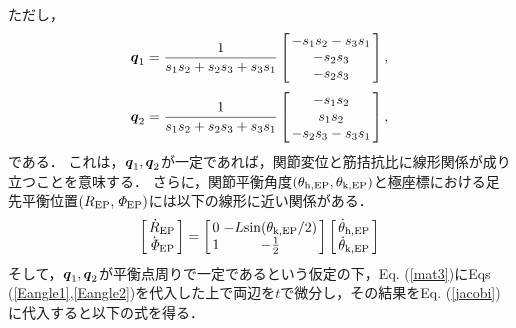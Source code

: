 ただし，
\begin{eqnarray}
 \arraycolsep=1.5pt
 \ve{q}_1=\frac{1}{s_{1}s_{2}+s_{2}s_{3}+s_{3}s_{1}}
 \left[
  \begin{array}{c}
   -s_{1}s_{2}-s_{3}s_{1} \\
   -s_{2}s_{3} \\
   -s_{2}s_{3}
  \end{array}
 \right],
 \label{q1}
\end{eqnarray}
\begin{eqnarray}
 \arraycolsep=1.5pt
 \ve{q}_2=\frac{1}{s_{1}s_{2}+s_{2}s_{3}+s_{3}s_{1}}
 \left[
  \begin{array}{c}
   -s_{1}s_{2} \\
   s_{1}s_{2} \\
   -s_{2}s_{3}-s_{3}s_{1}
  \end{array}
 \right],
 \label{q2}
\end{eqnarray}
である．
これは，$\mbox{\boldmath $q$}_1,\mbox{\boldmath $q$}_2$が一定であれば，関節変位と筋拮抗比に線形関係が成り立つことを意味する．
さらに，関節平衡角度$(\theta_{\rm h,EP},\theta_{\rm k,EP})$と極座標における足先平衡位置$(R_{\rm EP},{\it \Phi}_{\rm EP})$には以下の線形に近い関係がある\cite{Mitsuda1996}．
\begin{eqnarray}
 \arraycolsep=1.5pt
 \left[
  \begin{array}{c}
   \dot{R}_{\rm EP} \\
   \dot{\it \Phi}_{\rm EP}
  \end{array}
 \right]
 =
 \left[
  \begin{array}{cc}
   0 & -L{\rm sin}(\theta_{\rm k,EP}/2) \\ %
   1 & -\frac{1}{2}
  \end{array}
 \right]
 \left[
  \begin{array}{c}
   \dot{\theta}_{\rm h,EP} \\
   \dot{\theta}_{\rm k,EP}
  \end{array}
 \right]
 \label{jacobi}
\end{eqnarray}
そして，$\mbox{\boldmath $q$}_1,\mbox{\boldmath $q$}_2$が平衡点周りで一定であるという仮定の下，Eq. (\ref{mat3})にEqs (\ref{Eangle1},\ref{Eangle2})を代入した上で両辺を$t$で微分し，その結果をEq. (\ref{jacobi})に代入すると以下の式を得る．
